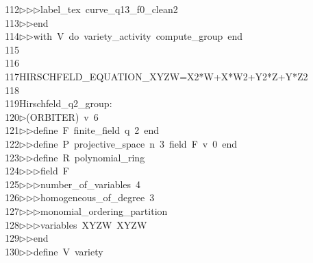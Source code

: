 \begin{tabbing}
112\>$\triangleright$\>$\triangleright$\>$\triangleright$\>label\_tex\ curve\_q13\_f0\_clean2\ \\[0pt]
113\>$\triangleright$\>$\triangleright$\>end\ \\[0pt]
114\>$\triangleright$\>$\triangleright$\>with\ V\ do\ variety\_activity\ compute\_group\ end\ \\[0pt]
115\>\\[0pt]
116\>\\[0pt]
117\>HIRSCHFELD\_EQUATION\_XYZW=X2*W+X*W2+Y2*Z+Y*Z2\\[0pt]
118\>\\[0pt]
119\>Hirschfeld\_q2\_group:\\[0pt]
120\>$\triangleright$\>(ORBITER)\ v\ 6\ \\[0pt]
121\>$\triangleright$\>$\triangleright$\>define\ F\ finite\_field\ q\ 2\ end\ \\[0pt]
122\>$\triangleright$\>$\triangleright$\>define\ P\ projective\_space\ n\ 3\ field\ F\ v\ 0\ end\ \\[0pt]
123\>$\triangleright$\>$\triangleright$\>define\ R\ polynomial\_ring\ \\[0pt]
124\>$\triangleright$\>$\triangleright$\>$\triangleright$\>field\ F\ \\[0pt]
125\>$\triangleright$\>$\triangleright$\>$\triangleright$\>number\_of\_variables\ 4\ \\[0pt]
126\>$\triangleright$\>$\triangleright$\>$\triangleright$\>homogeneous\_of\_degree\ 3\ \\[0pt]
127\>$\triangleright$\>$\triangleright$\>$\triangleright$\>monomial\_ordering\_partition\ \\[0pt]
128\>$\triangleright$\>$\triangleright$\>$\triangleright$\>variables\ XYZW\ XYZW\ \\[0pt]
129\>$\triangleright$\>$\triangleright$\>end\ \\[0pt]
130\>$\triangleright$\>$\triangleright$\>define\ V\ variety\ \\[0pt]

\end{tabbing}
